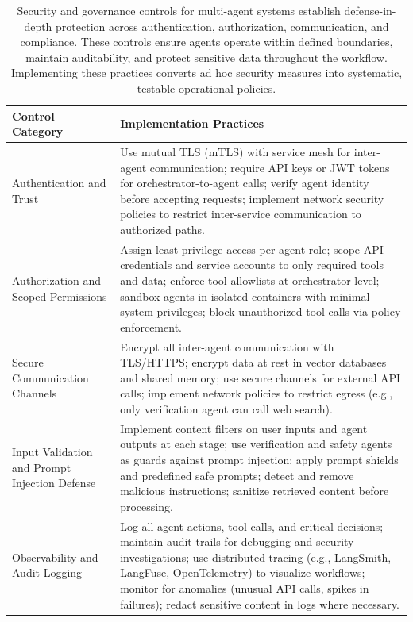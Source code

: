 \begin{table}[t]
\centering
\small
\caption{Security and governance controls for multi-agent systems establish defense-in-depth protection across authentication, authorization, communication, and compliance. These controls ensure agents operate within defined boundaries, maintain auditability, and protect sensitive data throughout the workflow. Implementing these practices converts ad hoc security measures into systematic, testable operational policies.}
\label{tab:ch09_security_governance_controls}
\setlength{\tabcolsep}{6pt}
\renewcommand{\arraystretch}{1.3}
\begin{tabularx}{\linewidth}{@{}p{3.2cm}X@{}}
\toprule
\rowcolor{gray!15}
\textbf{Control Category} & \textbf{Implementation Practices} \\
\midrule
Authentication and Trust & Use mutual TLS (mTLS) with service mesh for inter-agent communication; require API keys or JWT tokens for orchestrator-to-agent calls; verify agent identity before accepting requests; implement network security policies to restrict inter-service communication to authorized paths. \\
Authorization and Scoped Permissions & Assign least-privilege access per agent role; scope API credentials and service accounts to only required tools and data; enforce tool allowlists at orchestrator level; sandbox agents in isolated containers with minimal system privileges; block unauthorized tool calls via policy enforcement. \\
Secure Communication Channels & Encrypt all inter-agent communication with TLS/HTTPS; encrypt data at rest in vector databases and shared memory; use secure channels for external API calls; implement network policies to restrict egress (e.g., only verification agent can call web search). \\
Input Validation and Prompt Injection Defense & Implement content filters on user inputs and agent outputs at each stage; use verification and safety agents as guards against prompt injection; apply prompt shields and predefined safe prompts; detect and remove malicious instructions; sanitize retrieved content before processing. \\
Observability and Audit Logging & Log all agent actions, tool calls, and critical decisions; maintain audit trails for debugging and security investigations; use distributed tracing (e.g., LangSmith, LangFuse, OpenTelemetry) to visualize workflows; monitor for anomalies (unusual API calls, spikes in failures); redact sensitive content in logs where necessary. \\

\end{tabularx}
\end{table}
